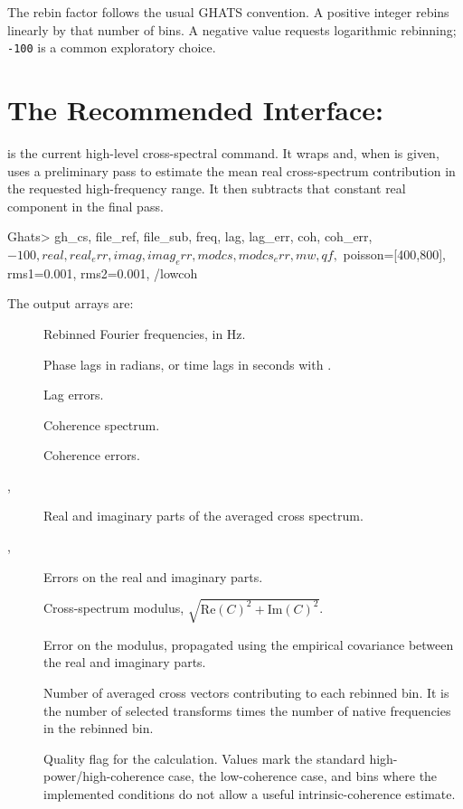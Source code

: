 The rebin factor  follows the usual GHATS convention.  A positive
integer rebins linearly by that number of bins.  A negative value requests
logarithmic rebinning; \texttt{-100} is a common exploratory choice.

\section{The Recommended Interface: }

 is the current high-level cross-spectral command.  It wraps
 and, when  is given,
uses a preliminary pass to estimate the mean real cross-spectrum contribution
in the requested high-frequency range.  It then subtracts that constant real
component in the final pass.

\begin{ghatsconsole}
Ghats> gh_cs, file_ref, file_sub, freq, lag, lag_err, coh, coh_err, $
       -100, real, real_err, imag, imag_err, modcs, modcs_err, mw, qf, $
       poisson=[400,800], rms1=0.001, rms2=0.001, /lowcoh
\end{ghatsconsole}

The output arrays are:

\begin{description}
\item[] Rebinned Fourier frequencies, in Hz.
\item[] Phase lags in radians, or time lags in seconds with
  .
\item[] Lag errors.
\item[] Coherence spectrum.
\item[] Coherence errors.
\item[, ] Real and imaginary parts of the averaged
  cross spectrum.
\item[, ] Errors on the real and imaginary
  parts.
\item[] Cross-spectrum modulus,
  \(\sqrt{\mathrm{Re}(C)^2+\mathrm{Im}(C)^2}\).
\item[] Error on the modulus, propagated using the empirical
  covariance between the real and imaginary parts.
\item[] Number of averaged cross vectors contributing to each
  rebinned bin.  It is the number of selected transforms times the number of
  native frequencies in the rebinned bin.
\item[] Quality flag for the  calculation.  Values
  mark the standard high-power/high-coherence case, the low-coherence case, and
  bins where the implemented conditions do not allow a useful
  intrinsic-coherence estimate.
\end{description}

